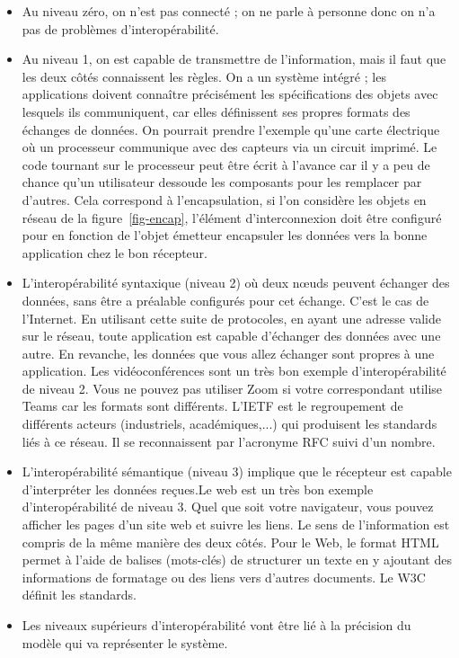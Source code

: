 \begin{itemize}
     \item Au niveau zéro, on n'est pas connecté ; on ne parle à personne donc on n'a pas de problèmes d'interopérabilité. 
    \item  Au niveau 1, on est capable de transmettre de l'information,  mais il faut que les deux côtés connaissent les règles. On a un système intégré ; les applications doivent  connaître précisément les spécifications des objets avec lesquels ils communiquent,  car elles définissent ses propres formats des échanges de données. On pourrait prendre l'exemple qu'une carte électrique où un processeur communique avec des capteurs via un circuit imprimé. Le code tournant sur le processeur peut être écrit à l'avance car il y a peu de chance qu'un utilisateur dessoude les composants pour les remplacer par d'autres. Cela correspond à l'encapsulation, si l'on considère les objets en réseau de la figure~\vref{fig-encap}, l'élément d'interconnexion doit être configuré pour en fonction de l'objet émetteur encapsuler les données vers la bonne application chez le bon récepteur. 
    \item L’interopérabilité syntaxique (niveau 2) où deux nœuds peuvent échanger des données, sans être a préalable configurés pour cet échange. C'est le cas de l'Internet. En utilisant cette suite de protocoles, en ayant une adresse valide sur le réseau, toute application est capable d'échanger des données avec une autre. En revanche, les données que vous allez échanger sont propres à une application. Les vidéoconférences sont un très bon exemple d'interopérabilité de niveau 2. Vous ne pouvez pas utiliser Zoom si votre correspondant utilise Teams car les formats sont différents. L'\ac{IETF}  est le regroupement de différents acteurs (industriels, académiques,...) qui produisent les standards liés à ce réseau. Il se reconnaissent par l'acronyme \ac{RFC} suivi d'un nombre. 
    \item L’interopérabilité sémantique (niveau 3) implique que le récepteur est capable d'interpréter les données reçues.Le web est un très bon exemple d'interopérabilité de niveau 3. Quel que soit votre navigateur, vous pouvez afficher les pages d'un site web et suivre les liens. Le sens de l'information est compris de la même manière des deux côtés. Pour le Web, le format \ac{HTML} permet à l'aide de balises (mots-clés) de structurer un texte en y ajoutant des informations de formatage ou des liens vers d'autres documents. Le W3C définit les standards.
     \item Les niveaux supérieurs d'interopérabilité vont être lié à la précision du modèle qui va représenter le système.     
\end{itemize}


